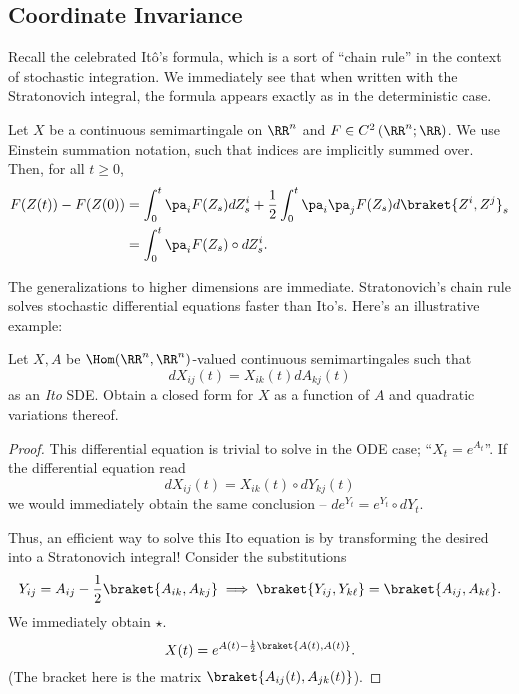 \documentclass{scrartcl}
\begin{document}
\subsection{Coordinate Invariance}

Recall the celebrated It\^o's formula, which is a sort of ``chain rule'' in the context of stochastic integration. We immediately see that when written with the Stratonovich integral, the formula appears exactly as in the deterministic case.

\begin{thm}
    [It\^o's Formula]
    Let $X$ be a continuous semimartingale on $\RR^n$ and $F\in C^2\left(\RR^n; \RR\right)$. We use Einstein summation notation, such that indices are implicitly summed over. Then, for all $t\geq 0$,
    \begin{align*}
        F(Z(t)) - F(Z(0)) &= \int_0^t \pa_i F(Z_s) dZ^i_s + \frac{1}{2} \int_0^t \pa_i \pa_j F(Z_s) d\braket{Z^i, Z^j}_s\\
        &= \int_0^t \pa_i F(Z_s) \circ dZ^i_s.
    \end{align*}
\end{thm}


The generalizations to higher dimensions are immediate. Stratonovich's chain rule solves stochastic differential equations faster than Ito's. Here's an illustrative example:

\begin{prob}
    Let $X, A$ be $\Hom(\RR^n, \RR^n)$-valued continuous semimartingales such that
    \[
        dX_{ij}(t) = X_{ik}(t) dA_{kj}(t)
    \]
    as an \emph{Ito} SDE. Obtain a closed form for $X$ as a function of $A$ and quadratic variations thereof.
\end{prob}

\begin{proof}
    This differential equation is trivial to solve in the ODE case; ``$X_t = e^{A_t}$''. If the differential equation read
    \[
        dX_{ij}(t) = X_{ik}(t) \circ dY_{kj}(t) \tag{$\star$}
    \]
    we would immediately obtain the same conclusion -- $de^{Y_t} = e^{Y_t} \circ dY_t$.

    Thus, an efficient way to solve this Ito equation is by transforming the desired into a Stratonovich integral! Consider the substitutions
    \[
        Y_{ij} = A_{ij} - \frac12 \braket{A_{ik}, A_{kj}}\implies \braket{Y_{ij}, Y_{k\ell}} = \braket{A_{ij}, A_{k\ell}}.
    \]
    We immediately obtain $\star$.
    \[
        X(t) = e^{A(t) - \frac12 \braket{A(t), A(t)}}.
    \]
    (The bracket here is the matrix $\braket{A_{ij}(t), A_{jk}(t)}$).
\end{proof}
\end{document}
